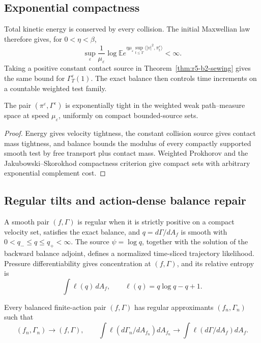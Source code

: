 \subsection{Exponential compactness}

Total kinetic energy is conserved by every collision.  The initial
Maxwellian law therefore gives, for \(0<\eta<\beta\),
\[
 \sup_\varepsilon
 \frac1{\mu_\varepsilon}
 \log\mathbb E e^{\eta\mu_\varepsilon
  \sup_{t\le T}\langle|v|^2,\pi_t^\varepsilon\rangle}<\infty.
\]
Taking a positive constant contact source in
Theorem~\ref{thm:r5-b2-sewing} gives the same bound for
\(\Gamma_T^\varepsilon(1)\).  The exact balance then controls time increments
on a countable weighted test family.

\begin{lemma}
\label{lem:r5-b2-tight}
The pair \((\pi^\varepsilon,\Gamma^\varepsilon)\) is exponentially tight in
the weighted weak path--measure space at speed \(\mu_\varepsilon\), uniformly
on compact bounded-source sets.
\end{lemma}

\begin{proof}
Energy gives velocity tightness, the constant collision source gives contact
mass tightness, and balance bounds the modulus of every compactly supported
smooth test by free transport plus contact mass.  Weighted Prokhorov and the
Jakubowski--Skorokhod compactness criterion give compact sets with arbitrary
exponential complement cost.
\end{proof}

\subsection{Regular tilts and action-dense balance repair}

A smooth pair \((f,\Gamma)\) is regular when it is strictly positive on a
compact velocity set, satisfies the exact balance, and
\(q=d\Gamma/dA_f\) is smooth with
\(0<q_-\le q\le q_+<\infty\).  The source
\(\psi=\log q\), together with the solution of the backward balance adjoint,
defines a normalized time-sliced trajectory likelihood.  Pressure
differentiability gives concentration at \((f,\Gamma)\), and its relative
entropy is
\[
 \int\ell(q)\,dA_f,
 \qquad \ell(q)=q\log q-q+1.
\]

\begin{lemma}
\label{lem:r5-b2-repair}
Every balanced finite-action pair \((f,\Gamma)\) has regular approximants
\((f_n,\Gamma_n)\) such that
\[
 (f_n,\Gamma_n)\to(f,\Gamma),
 \qquad
 \int\ell(d\Gamma_n/dA_{f_n})dA_{f_n}
 \to\int\ell(d\Gamma/dA_f)dA_f.
\]
\end{lemma}

